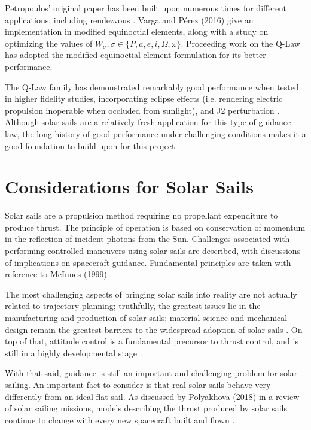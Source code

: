Petropoulos' original paper has been built upon numerous times for different applications, including rendezvous \cite{sanjeev2023}. Varga and Pérez (2016) \cite{vargaperez2016} give an implementation in modified equinoctial elements, along with a study on optimizing the values of \(W_\sigma, \sigma \in \{P, a, e, i, \Omega, \omega\}\). Proceeding work on the Q-Law has adopted the modified equinoctial element formulation \cite{sanjeev2023} for its better performance.

The Q-Law family has demonstrated remarkably good performance when tested in higher fidelity studies, incorporating eclipse effects (i.e. rendering electric propulsion inoperable when occluded from sunlight), and J2 perturbation \cite{vargaperez2016}. Although solar sails are a relatively fresh application for this type of guidance law, the long history of good performance under challenging conditions makes it a good foundation to build upon for this project.

\section{Considerations for Solar Sails}
Solar sails are a propulsion method requiring no propellant expenditure to produce thrust. The principle of operation is based on conservation of momentum in the reflection of incident photons from the Sun. Challenges associated with performing controlled maneuvers using solar sails are described, with discussions of implications on spacecraft guidance. Fundamental principles are taken with reference to McInnes (1999) \cite{mcinnes}.

The most challenging aspects of bringing solar sails into reality are not actually related to trajectory planning; truthfully, the greatest issues lie in the manufacturing and production of solar sails; material science and mechanical design remain the greatest barriers to the widespread adoption of solar sails \cite{mcinnes}. On top of that, attitude control is a fundamental precursor to thrust control, and is still in a highly developmental stage \cite{choi2015structural}.

With that said, guidance is still an important and challenging problem for solar sailing. An important fact to consider is that real solar sails behave very differently from an ideal flat sail. As discussed by Polyakhova (2018) in a review of solar sailing missions, models describing the thrust produced by solar sails continue to change with every new spacecraft built and flown \cite{polyakhova2018solar}.

